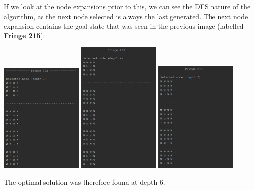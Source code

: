 \documentclass{article}
\begin{document}
	\newpage
	If we look at the node expansions prior to this, we can see the DFS nature of the algorithm, as the next node selected is always the last generated. The next node expansion contains the goal state that was seen in the previous image (labelled \textbf{Fringe 215}).
	\begin{multicols}{3}[\columnsep=2cm]
		\includegraphics[width=0.3\textwidth,keepaspectratio]{IDS-1-5-1.png}
		\columnbreak
		\includegraphics[width=0.3\textwidth,keepaspectratio]{IDS-1-5-2.png}
		\columnbreak
		\includegraphics[width=0.3\textwidth,keepaspectratio]{IDS-1-5-3.png}
	\end{multicols}
	
	\newpage
	The optimal solution was therefore found at depth 6.
	
\end{document}
